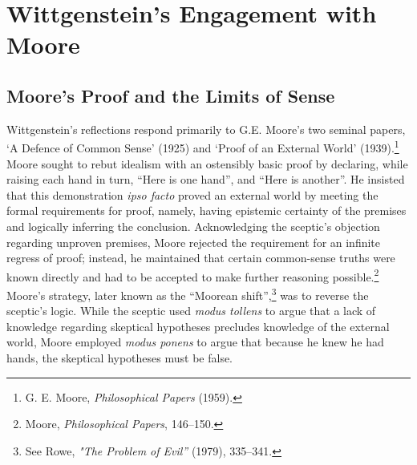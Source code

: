 \section{Wittgenstein's Engagement with Moore}

\subsection{Moore's Proof and the Limits of Sense}

Wittgenstein's reflections respond primarily to G.E. Moore's two seminal
papers, `A Defence of Common Sense' (1925) and `Proof of an External
World' (1939).\footnote{G. E. Moore, \emph{Philosophical Papers} (1959).}
Moore sought to rebut idealism with an ostensibly basic proof by
declaring, while raising each hand in turn, ``Here is one hand'', and
``Here is another''. He insisted that this demonstration \emph{ipso
facto} proved an external world by meeting the formal requirements for
proof, namely, having epistemic certainty of the premises and logically
inferring the conclusion. Acknowledging the sceptic's objection
regarding unproven premises, Moore rejected the requirement for an
infinite regress of proof; instead, he maintained that certain
common-sense truths were known directly and had to be accepted to make
further reasoning possible.\footnote{Moore, \emph{Philosophical Papers},
  146--150.} Moore's strategy, later known as the ``Moorean
shift'',\footnote{See Rowe, \emph{"The Problem of Evil''} (1979), 335--341.} was to reverse the sceptic's logic. While the sceptic used
\emph{modus tollens} to argue that a lack of knowledge regarding
skeptical hypotheses precludes knowledge of the external world, Moore
employed \emph{modus ponens} to argue that because he knew he had hands,
the skeptical hypotheses must be false.

